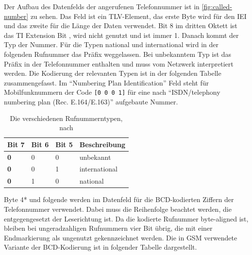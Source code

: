 Der Aufbau des Datenfelds der angerufenen Telefonnummer  ist in \autoref{fig:called-number} zu sehen. Das Feld ist ein \ac{TLV}-Element, das erste Byte wird für den \ac{IEI} und das zweite für die Länge der Daten verwendet. Bit 8 im dritten Oktett ist das \ac{TI} Extension Bit , wird nicht genutzt und ist immer 1. Danach kommt der Typ der Nummer. Für die Typen national und international wird in der folgenden Rufnummer das Präfix weggelassen. Bei unbekanntem Typ ist das Präfix in der Telefonnummer enthalten und muss vom Netzwerk interpretiert werden. Die Kodierung der relevanten Typen ist in der folgenden Tabelle zusammengefasst. Im "`Numbering Plan Identification"' Feld steht für Mobilfunknummern der Code \texttt{[0 0 0 1]} für eine nach "`ISDN/telephony numbering plan (Rec. E.164/E.163)"' aufgebaute Nummer.
\begin{table}[H]
\centering
\begin{tabular}{|l|l|l|l|}
\hline
\rowcolor[HTML]{F7F7F7}
\textbf{Bit 7} & \textbf{Bit 6} & \textbf{Bit  5} & \textbf{Beschreibung} \\ \hline
\textbf{0}     & 0              & 0               & unbekannt             \\ \hline
\textbf{0}     & 0              & 1               & international         \\ \hline
\textbf{0}     & 1              & 0               & national              \\ \hline
\end{tabular}
\caption[Die verschiedenen Rufnummerntypen]{Die verschiedenen Rufnummerntypen, nach }
\label{tab:number-type-coding}
\end{table}

Byte 4* und folgende werden im Datenfeld für die \ac{BCD}-kodierten Ziffern der Telefonnummer verwendet. Dabei muss die Reihenfolge beachtet werden, die entgegengesetzt der Leserichtung ist. Da die kodierte Rufnummer byte-aligned ist, bleiben bei ungeradzahligen Rufnummern vier Bit übrig, die mit einer Endmarkierung als ungenutzt gekennzeichnet werden. Die in \ac{GSM} verwendete Variante der \ac{BCD}-Kodierung ist in folgender Tabelle dargestellt.

